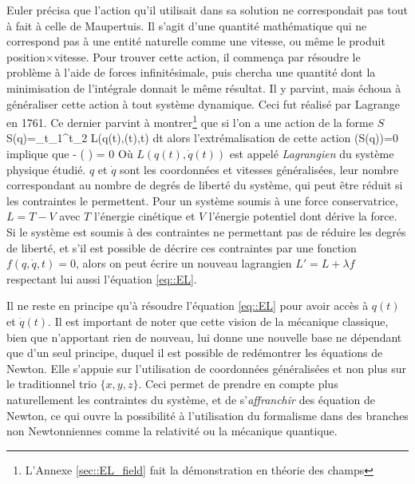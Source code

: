             Euler précisa que l'action qu'il utilisait dans sa solution ne correspondait pas tout à fait à celle de Maupertuis. Il s'agit d'une quantité mathématique qui ne correspond pas à une entité naturelle comme une vitesse, ou même le produit position$\times$vitesse. Pour trouver cette action, il commença par résoudre le problème à l'aide de forces infinitésimale, puis chercha une quantité dont la minimisation de l'intégrale donnait le même résultat. Il y parvint, mais échoua à généraliser cette action à tout système dynamique. Ceci fut réalisé par Lagrange en 1761. Ce dernier parvint à montrer\footnote{L'Annexe \ref{sec::EL_field} fait la démonstration en théorie des champs} que si l'on a une action de la forme $S$
            \beq
                S(q)=\int_{t_1}^{t_2} L\left(q(t),(t),t\right) dt
            \eeq
            alors l'extrémalisation de cette action \bs \delta(S(q))=0 \es implique que
            \beq\label{eq::EL}
                 - \left(  \right) = 0
            \eeq
            Où $L\left(q(t),\dot{q}(t)\right)$ est appelé \textit{Lagrangien} du système physique étudié. $q$ et $\dot{q}$ sont les coordonnées et vitesses généralisées, leur nombre correspondant au nombre de degrés de liberté du système, qui peut être réduit si les contraintes le permettent. Pour un système soumis à une force conservatrice, $L=T-V$ avec $T$ l'énergie cinétique et $V$ l'énergie potentiel dont dérive la force. Si le système est soumis à des contraintes ne permettant pas de réduire les degrés de liberté, et s'il est possible de décrire ces contraintes par une fonction $f(q,\dot{q},t)=0$, alors on peut écrire un nouveau lagrangien $L'=L+\lambda f$ respectant lui aussi l'équation \eqref{eq::EL}.
                
            Il ne reste en principe qu'à résoudre l'équation \eqref{eq::EL} pour avoir accès à $q(t)$ et $\dot{q}(t)$. Il est important de noter que cette vision de la mécanique classique, bien que n'apportant rien de nouveau, lui donne une nouvelle base ne dépendant que d'un seul principe, duquel il est possible de redémontrer les équations de Newton. Elle s'appuie sur l'utilisation de coordonnées généralisées et non plus sur le traditionnel trio $\{x,y,z\}$. Ceci permet de prendre en compte plus naturellement les contraintes du système, et de s'\textit{affranchir} des équation de Newton, ce qui ouvre la possibilité à l'utilisation du formalisme dans des branches non Newtonniennes comme la relativité ou la mécanique quantique.
        

